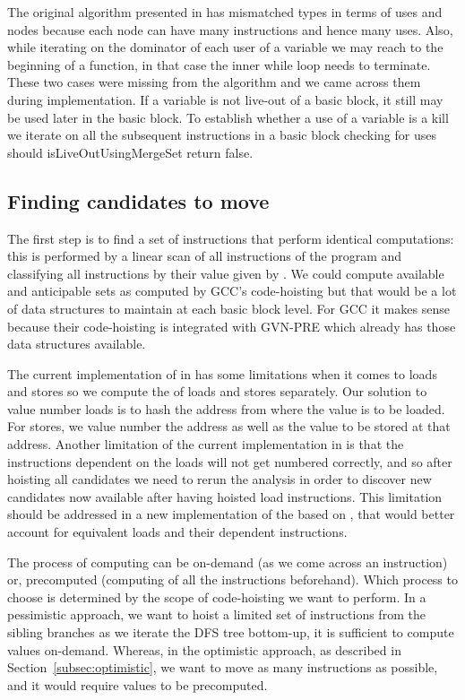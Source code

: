 \documentclass[acmlarge,review]{acmart}\settopmatter{printfolios=true}
\begin{document}
The original algorithm presented in \cite{das2012} has mismatched types in terms
of uses and nodes because each node can have many instructions and hence many
uses. Also, while iterating on the dominator of each user of a variable we may
reach to the beginning of a function, in that case the inner while loop needs to
terminate. These two cases were missing from the algorithm and we came across
them during implementation. If a variable is not live-out of a basic block, it
still may be used later in the basic block. To establish whether a use of a
variable is a kill we iterate on all the subsequent instructions in a basic
block checking for uses should isLiveOutUsingMergeSet return false.

\subsection{Finding candidates to move}
\label{subsec:finding-candidates}
The first step is to find a set of instructions that perform identical
computations: this is performed by a linear scan of all instructions of the
program and classifying all instructions by their value given by \GVN{}. We
could compute available and anticipable sets as computed by GCC's code-hoisting
but that would be a lot of data structures to maintain at each basic block
level. For GCC it makes sense because their code-hoisting is integrated with
GVN-PRE which already has those data structures available.

The current implementation of \GVN{} in \LLVM{} has some limitations when it
comes to loads and stores so we compute the \GVN{} of loads and stores
separately.  Our solution to value number loads is to hash the address from
where the value is to be loaded. For stores, we value number the address as well
as the value to be stored at that address. Another limitation of the current
\GVN{} implementation in \LLVM{} is that the instructions dependent on the loads
will not get numbered correctly, and so after hoisting all candidates we need to
rerun the \GVN{} analysis in order to discover new candidates now available
after having hoisted load instructions.  This limitation should be addressed in
a new implementation of the \GVN{} based on \MemorySSA{}, that would better
account for equivalent loads and their dependent instructions.

The process of computing \GVN{} can be on-demand (as we come across an
instruction) or, precomputed (computing \GVN{} of all the instructions
beforehand). Which process to choose is determined by the scope of code-hoisting
we want to perform. In a pessimistic approach, we want to hoist a limited set of
instructions from the sibling branches as we iterate the DFS tree bottom-up, it
is sufficient to compute \GVN{} values on-demand. Whereas, in the optimistic
approach, as described in Section~\ref{subsec:optimistic}, we want to move as
many instructions as possible, and it would require \GVN{} values to be
precomputed.
\end{document}
